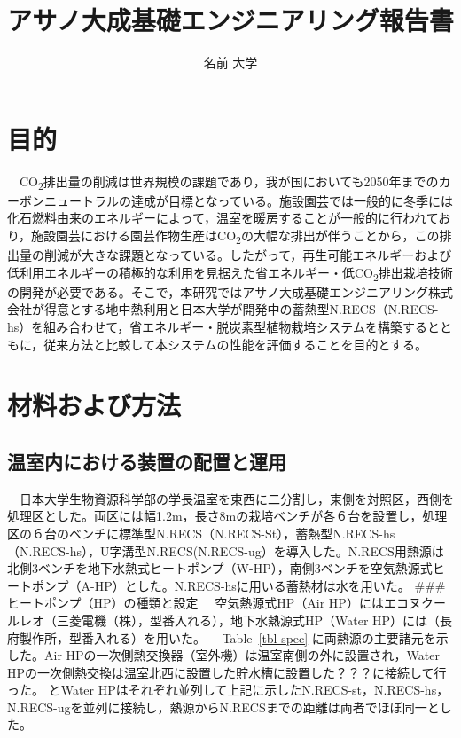 \documentclass[
  japanese,
  11pt,
  letterpaper,
  DIV=11,
  numbers=noendperiod]{scrartcl}
\title{アサノ大成基礎エンジニアリング報告書}
\author{名前 大学}
\date{}
\begin{document}
\maketitle


\newpage

\section{目的}\label{ux76eeux7684}

　CO\textsubscript{2}排出量の削減は世界規模の課題であり，我が国においても2050年までのカーボンニュートラルの達成が目標となっている。施設園芸では一般的に冬季には化石燃料由来のエネルギーによって，温室を暖房することが一般的に行われており，施設園芸における園芸作物生産はCO\textsubscript{2}の大幅な排出が伴うことから，この排出量の削減が大きな課題となっている。したがって，再生可能エネルギーおよび低利用エネルギーの積極的な利用を見据えた省エネルギー・低CO\textsubscript{2}排出栽培技術の開発が必要である。そこで，本研究ではアサノ大成基礎エンジニアリング株式会社が得意とする地中熱利用と日本大学が開発中の蓄熱型N.RECS（N.RECS-hs）を組み合わせて，省エネルギー・脱炭素型植物栽培システムを構築するとともに，従来方法と比較して本システムの性能を評価することを目的とする。

\section{材料および方法}\label{ux6750ux6599ux304aux3088ux3073ux65b9ux6cd5}

\subsection{温室内における装置の配置と運用}\label{ux6e29ux5ba4ux5185ux306bux304aux3051ux308bux88c5ux7f6eux306eux914dux7f6eux3068ux904bux7528}

　日本大学生物資源科学部の学長温室を東西に二分割し，東側を対照区，西側を処理区とした。両区には幅1.2m，長さ8mの栽培ベンチが各６台を設置し，処理区の６台のベンチに標準型N.RECS（N.RECS-St），蓄熱型N.RECS-hs（N.RECS-hs），U字溝型N.RECS(N.RECS-ug）を導入した。N.RECS用熱源は北側3ベンチを地下水熱式ヒートポンプ（W-HP），南側3ベンチを空気熱源式ヒートポンプ（A-HP）とした。N.RECS-hsに用いる蓄熱材は水を用いた。
\#\#\# ヒートポンプ（HP）の種類と設定 　空気熱源式HP（Air
HP）にはエコヌクールレオ（三菱電機（株），型番入れる），地下水熱源式HP（Water
HP）には（長府製作所，型番入れる）を用いた。 　Table~\ref{tbl-spec}
に両熱源の主要諸元を示した。Air
HPの一次側熱交換器（室外機）は温室南側の外に設置され，Water
HPの一次側熱交換は温室北西に設置した貯水槽に設置した？？？に接続して行った。
とWater
HPはそれぞれ並列して上記に示したN.RECS-st，N.RECS-hs，N.RECS-ugを並列に接続し，熱源からN.RECSまでの距離は両者でほぼ同一とした。
\end{document}
